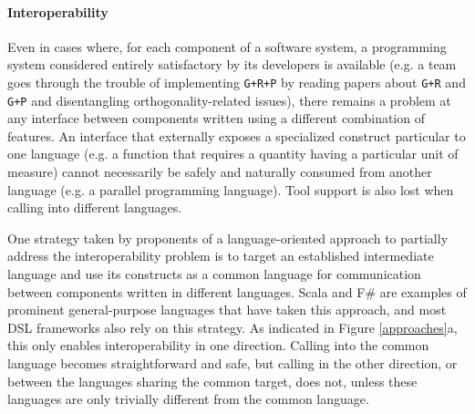 
\paragraph{Interoperability} Even in cases where, for each component of a software system, a programming system considered entirely satisfactory by its developers is available (e.g. a team goes through the trouble of implementing \verb|G+R+P| by reading papers about \verb|G+R| and \verb|G+P| and disentangling orthogonality-related issues), there remains a problem at any interface between  components written using a different combination of features. An interface that  externally exposes a specialized construct particular to one language (e.g. a function that requires a quantity having a particular unit of measure) cannot necessarily be safely and naturally consumed from another language (e.g. a parallel programming language). Tool support is also lost when calling into different languages. %

One strategy taken by proponents of a {language-oriented approach} \cite{journals/stp/Ward94} to partially address the interoperability problem is to  target an established intermediate language and use its constructs as a common language for communication between components written in different languages. Scala \cite{200464/IC} and F\# \cite{pickering2007foundations} are examples of prominent general-purpose languages that have taken this approach, and most DSL frameworks also rely on this strategy. As indicated in Figure \ref{approaches}a, this only enables interoperability in one direction. Calling into the common language becomes straightforward and safe, but calling in the other direction, or between the languages sharing the common target, does not, unless these languages are only trivially different from the common language. 

